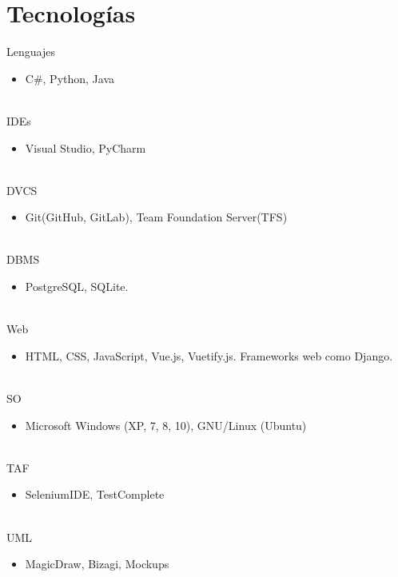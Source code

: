 \documentclass[letterpaper]{twentysecondcves} %
\begin{document}
\section{Tecnologías}
\begin{twenty}
	
	 \twentyitem
    	{Lenguajes}
		{}
        {}
        {}
        {}
        {
        {\begin{itemize}
        \item C\#, Python, Java
		\end{itemize}}
        }
        \\
	\twentyitem
    	{IDEs}
		{}
        {}
        {}
        {}
        {
        {\begin{itemize}
        \item Visual Studio, PyCharm
		\end{itemize}}
        }
        \\
        \twentyitem
    	{DVCS}
		{}
        {}
        {}
        {}
        {
        {\begin{itemize}
        \item Git(GitHub, GitLab), Team Foundation Server(TFS)
		\end{itemize}}
		}
		\\
        \twentyitem
	    {DBMS}
		{}
        {}
        {}
        {}
        {
        {\begin{itemize}
        \item PostgreSQL, SQLite.
		\end{itemize}}
		}
		\\
        \twentyitem
	    {Web}
		{}
        {}
        {}
        {}
        {
        {\begin{itemize}
        \item HTML, CSS, JavaScript, Vue.js, Vuetify.js. Frameworks web como Django.
		\end{itemize}}
		}
		\\
        \twentyitem
	    {SO}
		{}
        {}
        {}
        {}
        {
        {\begin{itemize}
        \item Microsoft Windows (XP, 7, 8, 10), GNU/Linux (Ubuntu)
		\end{itemize}}
		}
		\\
        \twentyitem
	    {TAF}
		{}
        {}
        {}
        {}
        {
        {\begin{itemize}
        \item SeleniumIDE, TestComplete
		\end{itemize}}
		}
		\\
        \twentyitem
	    {UML}
		{}
        {}
        {}
        {}
        {
        {\begin{itemize}
        \item MagicDraw, Bizagi, Mockups
		\end{itemize}}
		}
\end{twenty}
\end{document}
